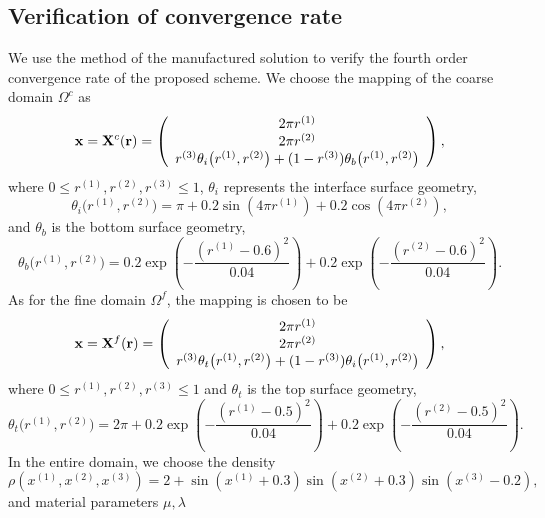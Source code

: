 \subsection{Verification of convergence rate}\label{convergence_study}
We use the method of the manufactured solution to verify the fourth order  convergence rate of the proposed scheme. We choose the mapping of the coarse domain $\Omega^c$ as
\[ {\bf x} = {\bf X}^c({\bf r}) = \left(\begin{array}{c}
2\pi r^{(1)} \\
2\pi r^{(2)} \\
r^{(3)}\theta_i\big(r^{(1)},r^{(2)}\big) + (1-r^{(3)})\theta_b\big(r^{(1)},r^{(2)}\big) \end{array}\right), \]
where $0\leq r^{(1)}, r^{(2)}, r^{(3)}\leq 1$, $\theta_i$ represents the interface surface geometry,
\begin{equation}\label{iterface_geometry}
\theta_i\big(r^{(1)},r^{(2)}\big) = \pi+0.2\sin(4\pi r^{(1)})+0.2\cos(4\pi r^{(2)}),
\end{equation}
and $\theta_b$ is the bottom surface geometry,
\begin{equation*}\label{bottom_geometry}
\theta_b\big(r^{(1)},r^{(2)}\big) = 0.2\exp\left(-\frac{(r^{(1)}-0.6)^2}{0.04}\right)+0.2\exp\left(-\frac{(r^{(2)}-0.6)^2}{0.04}\right).
\end{equation*}
As for the fine domain $\Omega^f$, the mapping is chosen to be
\[ {\bf x} = {\bf X}^f({\bf r}) = \left(\begin{array}{c}
2\pi r^{(1)}\\
2\pi r^{(2)}\\
r^{(3)}\theta_t\big(r^{(1)},r^{(2)}\big) + (1-r^{(3)})\theta_i\big(r^{(1)},r^{(2)}\big) \end{array}\right), \]
where $0\leq r^{(1)}, r^{(2)}, r^{(3)}\leq 1$ and $\theta_t$ is the top surface geometry,
\begin{equation*}\label{top_geometry}
\theta_t\big(r^{(1)},r^{(2)}\big) = 2\pi+0.2\exp\left(-\frac{(r^{(1)}-0.5)^2}{0.04}\right)+0.2\exp\left(-\frac{(r^{(2)}-0.5)^2}{0.04}\right).
\end{equation*}
In the entire domain, we choose the density 
\begin{equation*}\label{density_function}
\rho(x^{(1)},x^{(2)},x^{(3)}) = 2 + \sin(x^{(1)}+0.3)\sin(x^{(2)}+0.3)\sin(x^{(3)}-0.2),
\end{equation*}
and material parameters $\mu, \lambda$ 
